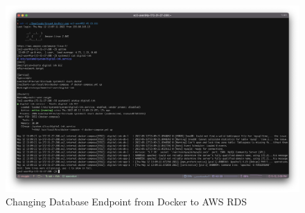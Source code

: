 \begin{figure}[!htbp]
    \centering
    \includegraphics[width=\textwidth]{resources/rds/envupdate.png}
    \caption{Changing Database Endpoint from Docker to AWS RDS}
    \label{fig:rds-env-update}
\end{figure}

